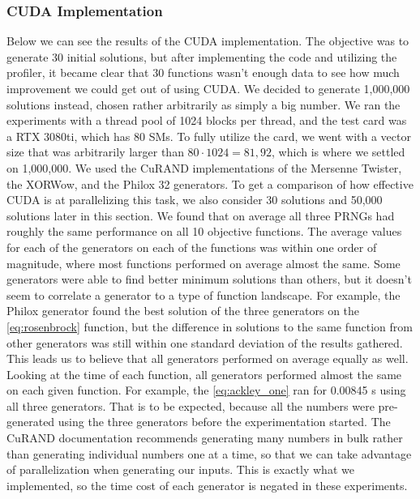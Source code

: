 \documentclass{article}
\begin{document}
\subsubsection{CUDA Implementation}
Below we can see the results of the CUDA implementation. The objective was to generate 30 initial solutions, but after implementing the code and utilizing the profiler, it became clear that 30 functions wasn't enough data to see how much improvement we could get out of using CUDA. We decided to generate 1,000,000 solutions instead, chosen rather arbitrarily as simply a big number. We ran the experiments with a thread pool of 1024 blocks per thread, and the test card was a RTX 3080ti, which has 80 SMs. To fully utilize the card, we went with a vector size that was arbitrarily larger than $80\cdot 1024 = 81,92$, which is where we settled on 1,000,000. We used the CuRAND implementations of the Mersenne Twister, the XORWow, and the Philox 32 generators. To get a comparison of how effective CUDA is at parallelizing this task, we also consider 30 solutions and 50,000 solutions later in this section. We found that on average all three PRNGs had roughly the same performance on all 10 objective functions. The average values for each of the generators on each of the functions was within one order of magnitude, where most functions performed on average almost the same. Some generators were able to find better minimum solutions than others, but it doesn't seem to correlate a generator to a type of function landscape. For example, the Philox generator found the best solution of the three generators on the \ref{eq:rosenbrock} function, but the difference in solutions to the same function from other generators was still within one standard deviation of the results gathered. This leads us to believe that all generators performed on average equally as well. Looking at the time of each function, all generators performed almost the same on each given function. For example, the \ref{eq:ackley_one} ran for 0.00845 s using all three generators. That is to be expected, because all the numbers were pre-generated using the three generators before the experimentation started. The CuRAND documentation recommends generating many numbers in bulk rather than generating individual numbers one at a time, so that we can take advantage of parallelization when generating our inputs. This is exactly what we implemented, so the time cost of each generator is negated in these experiments.
\end{document}
